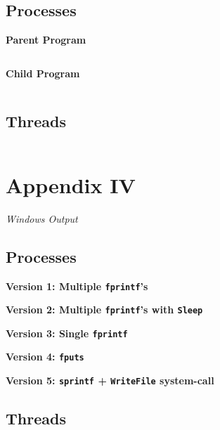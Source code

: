 \documentclass[12pt]{article}
\newcommand {\filename}[1] {\flushleft \textbf{#1}}
\newcommand {\append}[2] {\section*{Appendix #1} \textsl{\large #2}}
\newcommand {\includesource}[2] {\inputminted[linenos, fontsize=\scriptsize, frame=lines]{#1}{#2}}
\newcommand {\includeoutput}[1] {\VerbatimInput[fontsize=\scriptsize, numbers=left, frame=lines, commandchars=\%\{\}]{#1}}
\begin{document}
\subsection*{Processes}

\filename{Parent Program}
\includesource{c}{win_processes_main.c}

\filename{Child Program}
\includesource{c}{win_processes.c}


\subsection*{Threads}
\includesource{c}{win_threads.c}

\append{IV} {Windows Output}
\subsection*{Processes}
\filename{Version 1: Multiple \texttt{fprintf}'s}

\filename{Version 2: Multiple \texttt{fprintf}'s with \texttt{Sleep}}
 
\filename{Version 3: Single \texttt{fprintf}}
 
\filename{Version 4: \texttt{fputs}}
 
\filename{Version 5: \texttt{sprintf} + \texttt{WriteFile} system-call}


\subsection*{Threads}
\end{document}
